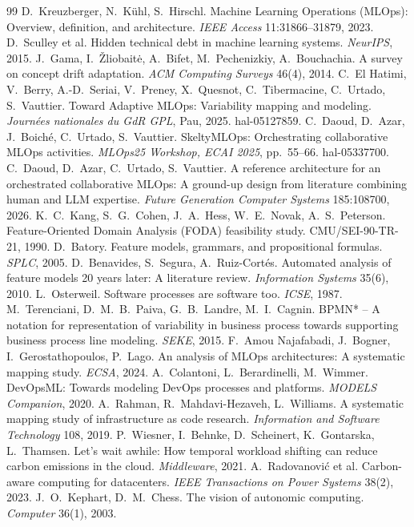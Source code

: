 \documentclass[10pt,a4paper]{article}
\begin{document}
\begin{thebibliography}{99}\small
{} D.~Kreuzberger, N.~Kühl, S.~Hirschl. Machine Learning Operations (MLOps): Overview, definition, and architecture. \emph{IEEE Access} 11:31866--31879, 2023.
 D.~Sculley et al. Hidden technical debt in machine learning systems. \emph{NeurIPS}, 2015.
 J.~Gama, I.~Žliobaitė, A.~Bifet, M.~Pechenizkiy, A.~Bouchachia. A survey on concept drift adaptation. \emph{ACM Computing Surveys} 46(4), 2014.
 C.~El Hatimi, V.~Berry, A.-D.~Seriai, V.~Preney, X.~Quesnot, C.~Tibermacine, C.~Urtado, S.~Vauttier. Toward Adaptive MLOps: Variability mapping and modeling. \emph{Journées nationales du GdR GPL}, Pau, 2025. hal-05127859.
 C.~Daoud, D.~Azar, J.~Boiché, C.~Urtado, S.~Vauttier. SkeltyMLOps: Orchestrating collaborative MLOps activities. \emph{MLOps25 Workshop, ECAI 2025}, pp.~55--66. hal-05337700.
 C.~Daoud, D.~Azar, C.~Urtado, S.~Vauttier. A reference architecture for an orchestrated collaborative MLOps: A ground-up design from literature combining human and LLM expertise. \emph{Future Generation Computer Systems} 185:108700, 2026.
 K.~C.~Kang, S.~G.~Cohen, J.~A.~Hess, W.~E.~Novak, A.~S.~Peterson. Feature-Oriented Domain Analysis (FODA) feasibility study. CMU/SEI-90-TR-21, 1990.
 D.~Batory. Feature models, grammars, and propositional formulas. \emph{SPLC}, 2005.
 D.~Benavides, S.~Segura, A.~Ruiz-Cortés. Automated analysis of feature models 20 years later: A literature review. \emph{Information Systems} 35(6), 2010.
 L.~Osterweil. Software processes are software too. \emph{ICSE}, 1987.
 M.~Terenciani, D.~M.~B.~Paiva, G.~B.~Landre, M.~I.~Cagnin. BPMN* -- A notation for representation of variability in business process towards supporting business process line modeling. \emph{SEKE}, 2015.
 F.~Amou Najafabadi, J.~Bogner, I.~Gerostathopoulos, P.~Lago. An analysis of MLOps architectures: A systematic mapping study. \emph{ECSA}, 2024.
 A.~Colantoni, L.~Berardinelli, M.~Wimmer. DevOpsML: Towards modeling DevOps processes and platforms. \emph{MODELS Companion}, 2020.
 A.~Rahman, R.~Mahdavi-Hezaveh, L.~Williams. A systematic mapping study of infrastructure as code research. \emph{Information and Software Technology} 108, 2019.
 P.~Wiesner, I.~Behnke, D.~Scheinert, K.~Gontarska, L.~Thamsen. Let's wait awhile: How temporal workload shifting can reduce carbon emissions in the cloud. \emph{Middleware}, 2021.
 A.~Radovanović et al. Carbon-aware computing for datacenters. \emph{IEEE Transactions on Power Systems} 38(2), 2023.
 J.~O.~Kephart, D.~M.~Chess. The vision of autonomic computing. \emph{Computer} 36(1), 2003.
\end{thebibliography}
\end{document}
